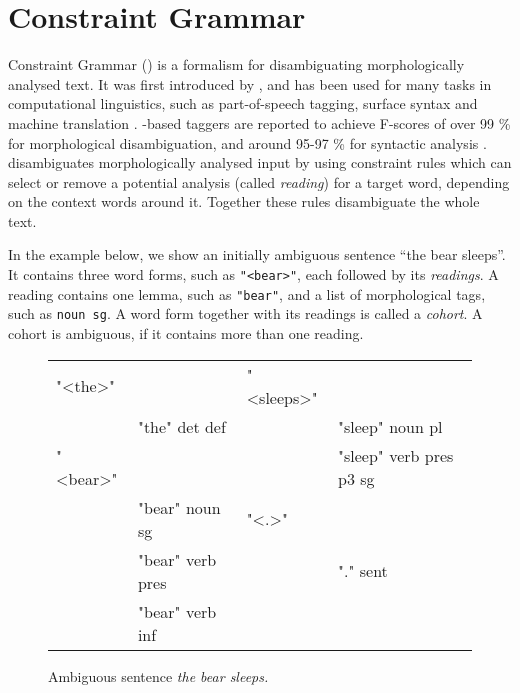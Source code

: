 \newcommand{\quality}[1]{${\tt Quality_{#1}}$}
\newcommand{\kind}[1]{${\tt Kind_{#1}}$}
\newcommand{\very}[1]{${\tt Very_{#1}}$}
\newcommand{\comment}{${\tt Comment}$}
\newcommand{\modFun}[2]{${\tt Mod_{#1,#2}}$}
\newcommand{\predFun}[3]{${\tt Pred_{#1,#2,#3}}$}
\newcommand{\itemSpa}[2]{${\tt Item_{#1,#2}}$}
\newcommand{\itemEng}[1]{${\tt Item_{#1}}$}
\def\t#1{\texttt{#1}}

\section{Constraint Grammar}
\label{sec:cg-intro}

Constraint Grammar (\onlycg{}) is a formalism for disambiguating
morphologically analysed text.  It was first introduced by
\citet{karlsson1990cgp}, and has been used for many tasks in
computational linguistics, such as part-of-speech tagging, surface
syntax and machine translation \cite{bick2011}.  \onlycg{}-based
taggers are reported to achieve F-scores of over 99 \% for
morphological disambiguation, and around 95-97 \% for syntactic
analysis \cite{bick2000palavras,bick2003hybridCG_PSG,bick2006spanish}.
\onlycg{} disambiguates morphologically analysed input by using
constraint rules which can select or remove a potential analysis
(called \emph{reading}) for a target word, depending on the context
words around it.  Together these rules disambiguate the whole text.


In the example below, we show an initially ambiguous sentence ``the bear
sleeps''. 
It contains three word forms, such as \t{"<bear>"}, each followed by its \emph{readings}.
A reading contains one lemma, such as \t{"bear"}, and a list of morphological tags, such as \t{noun sg}.
A word form together with its readings is called a \emph{cohort}. A cohort is ambiguous, if it contains more than one reading.

\begin{figure}[h]
\centering
\ttfamily
\begin{tabular}{p{0.6cm} l  p{0.6cm} l}
"<the>"  &                & "<sleeps>"        \\
    & "the" det def       &     & "sleep" noun pl \\
"<bear>" &                &     & "sleep" verb pres p3 sg \\
    & "bear" noun sg      & "<.>"                   \\
    & "bear" verb pres    &     & "." sent          \\
    & "bear" verb inf \\
\end{tabular}
\label{fig:theBearSleeps}
\caption{Ambiguous sentence {\em the bear sleeps.}}
\end{figure}


